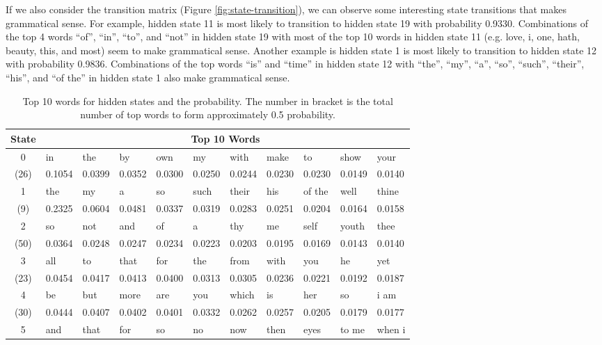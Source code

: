 If we also consider the transition matrix (Figure \ref{fig:state-transition}), we can observe some interesting state transitions that makes grammatical sense. For example, hidden state 11 is most likely to transition to hidden state 19 with probability 0.9330. Combinations of the top 4 words ``of'', ``in'', ``to'', and ``not'' in hidden state 19 with most of the top 10 words in hidden state 11 (e.g. love, i, one, hath, beauty, this, and most) seem to make grammatical sense. Another example is hidden state 1 is most likely to transition to hidden state 12 with probability 0.9836. Combinations of the top words ``is'' and ``time'' in hidden state 12 with ``the'', ``my'', ``a'', ``so'', ``such'', ``their'', ``his'', and ``of the'' in hidden state 1 also make grammatical sense.


\begin{table}[H]
	\centering
	\caption{Top 10 words for hidden states and the probability. The number in bracket is the total number of top words to form approximately 0.5 probability.}\label{tab:top-10-words}
	\begin{tabular}{c||l|l|l|l|l|l|l|l|l|l}
		\hline
		State & \multicolumn{10}{c}{Top 10 Words}\\ \hline
		0 & in & the & by & own & my & with & make & to & show & your \\
		(26) & 0.1054 & 0.0399 & 0.0352 & 0.0300 & 0.0250 & 0.0244 & 0.0230 & 0.0230 & 0.0149 & 0.0140 \\ \hline
		1 & the & my & a & so & such & their & his & of the & well & thine \\
		(9) & 0.2325 & 0.0604 & 0.0481 & 0.0337 & 0.0319 & 0.0283 & 0.0251 & 0.0204 & 0.0164 & 0.0158 \\ \hline
		2 & so & not & and & of & a & thy & me & self & youth & thee \\
		(50) & 0.0364 & 0.0248 & 0.0247 & 0.0234 & 0.0223 & 0.0203 & 0.0195 & 0.0169 & 0.0143 & 0.0140 \\ \hline
		3 & all & to & that & for & the & from & with & you & he & yet \\
		(23) & 0.0454 & 0.0417 & 0.0413 & 0.0400 & 0.0313 & 0.0305 & 0.0236 & 0.0221 & 0.0192 & 0.0187 \\ \hline
		4 & be & but & more & are & you & which & is & her & so & i am \\
		(30) & 0.0444 & 0.0407 & 0.0402 & 0.0401 & 0.0332 & 0.0262 & 0.0257 & 0.0205 & 0.0179 & 0.0177 \\ \hline
		5 & and & that & for & so & no & now & then & eyes & to me & when i \\

\end{tabular}
\end{table}
